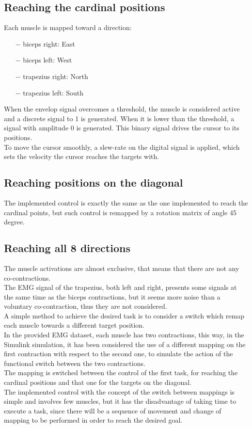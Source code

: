 \documentclass{article}
\begin{document}
	\subsection*{Reaching the cardinal positions}
	Each muscle is mapped toward a direction:
	\begin{itemize}
		\item[$-$] biceps right: East
		\item[$-$] biceps left: West
		\item[$-$] trapezius right: North
		\item[$-$] trapezius left: South
	\end{itemize}
	When the envelop signal overcomes a threshold, the muscle is considered active and a discrete signal to 1 is generated. When it is lower than the threshold, a signal with amplitude 0 is generated. This binary signal drives the cursor to its positions.\\
	To move the cursor smoothly, a slew-rate on the digital signal is applied, which sets the velocity the cursor reaches the targets with.
	
	\subsection*{Reaching positions on the diagonal}
	The implemented control is exactly the same as the one implemented to reach the cardinal points, but such control is remapped by a rotation matrix of angle 45 degree.
	
	\subsection*{Reaching all 8 directions}
	The muscle activations are almost exclusive, that means that there are not any co-contractions.\\
	The EMG signal of the trapezius, both left and right, presents some signals at the same time as the biceps contractions, but it seems more noise than a voluntary co-contraction, thus they are not considered.\\
	A simple method to achieve the desired task is to consider a switch which remap each muscle towards a different target position.\\
	In the provided EMG dataset, each muscle has two contractions, this way, in the Simulink simulation, it has been considered the use of a different mapping on the first contraction with respect to the second one, to simulate the action of the functional switch between the two contractions.\\
	The mapping is switched between the control of the first task, for reaching the cardinal positions and that one for the targets on the diagonal.\\
	The implemented control with the concept of the switch between mappings is simple and involves few muscles, but it has the disadvantage of taking time to execute a task, since there will be a sequence of movement and change of mapping to be performed in order to reach the desired goal.
	
\end{document}
